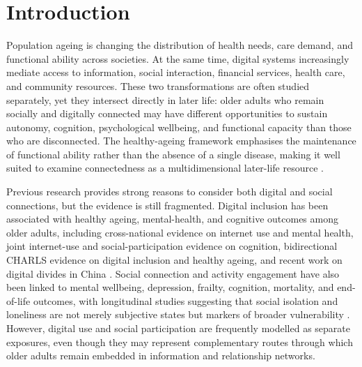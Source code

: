 \documentclass[pdflatex,sn-nature]{sn-jnl}
\begin{document}

\maketitle

\section{Introduction}

Population ageing is changing the distribution of health needs, care demand, and functional ability across societies. At the same time, digital systems increasingly mediate access to information, social interaction, financial services, health care, and community resources. These two transformations are often studied separately, yet they intersect directly in later life: older adults who remain socially and digitally connected may have different opportunities to sustain autonomy, cognition, psychological wellbeing, and functional capacity than those who are disconnected. The healthy-ageing framework emphasises the maintenance of functional ability rather than the absence of a single disease, making it well suited to examine connectedness as a multidimensional later-life resource \cite{beard2015world,teramoto2024global,collaborators2022global}.

Previous research provides strong reasons to consider both digital and social connections, but the evidence is still fragmented. Digital inclusion has been associated with healthy ageing, mental-health, and cognitive outcomes among older adults, including cross-national evidence on internet use and mental health, joint internet-use and social-participation evidence on cognition, bidirectional CHARLS evidence on digital inclusion and healthy ageing, and recent work on digital divides in China \cite{li2025tenyear,luo2024positive,yuan2025associations,yang2026bidirectional,chen2023digital}. Social connection and activity engagement have also been linked to mental wellbeing, depression, frailty, cognition, mortality, and end-of-life outcomes, with longitudinal studies suggesting that social isolation and loneliness are not merely subjective states but markers of broader vulnerability \cite{mak2023hobby,santini2020social,davies2021longitudinal,samtani2022associations,pivodic2024social}. However, digital use and social participation are frequently modelled as separate exposures, even though they may represent complementary routes through which older adults remain embedded in information and relationship networks.
\end{document}
